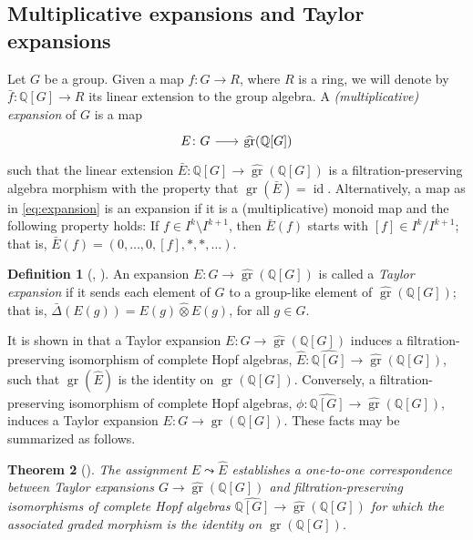\documentclass{article}
\numberwithin{equation}{section}
\newtheorem{theorem}{Theorem}[section]
\theoremstyle{definition}
\newtheorem{definition}[theorem]{Definition}
\newcommand{\Q}{\mathbb{Q}}
\DeclareMathOperator{\gr}{gr}
\DeclareMathOperator{\id}{id}
\begin{document}
\subsection{Multiplicative expansions and Taylor expansions}
\label{subsec:exp}
Let $G$ be a group. 
Given a map $f\colon G\to R$, where $R$ is a ring, we will 
denote by $\bar{f} \colon \Q[G]\to R$ its linear extension to 
the group algebra. 
A \emph{\textup{(}multiplicative\textup{)} expansion}\/
of $G$ is a map 
\begin{equation}
\label{eq:expansion}
\begin{tikzcd}[column sep=18pt]
E\colon G \ar[r]& \widehat{\gr}(\Q[G])
\end{tikzcd}
\end{equation}
such that the linear extension $\bar{E}\colon\Q[G]\to \widehat{\gr}(\Q[G])$  
is a filtration-preserving algebra morphism with the property that $\gr(\bar{E})=\id$. 
Alternatively, a map as in \eqref{eq:expansion} is an expansion 
if it is a (multiplicative) monoid map  and the following 
property holds:  If $f\in I^k\setminus I^{k+1}$, then $\bar{E}(f)$ 
starts with $[f]\in I^k/I^{k+1}$; that is, $\bar{E}(f)=(0,\dots,0,[f],*,*,\dots)$.  

\begin{definition}[\cite{Bar-Natan16}, \cite{SW-ejm}]
\label{def:taylor} 
An expansion $E\colon G \to \widehat{\gr}(\Q[G])$ is 
called a {\em Taylor expansion}\/ if it sends each element of 
$G$ to a group-like element of $\widehat{\gr}(\Q[G])$;  
that is, $\bar\Delta (E(g))=E(g) \hat{\otimes} E(g)$, 
for all $g\in G$.  
\end{definition}

It is shown in \cite{SW-ejm} that a Taylor expansion 
$E\colon G\to \widehat{\gr}(\Q[G])$ induces a 
filtration-pre\-serving isomorphism of complete Hopf algebras,  
$\widehat{E}\colon \widehat{\Q[G]}\to \widehat{\gr}(\Q[G])$, such that 
$\gr(\widehat{E})$ is the identity on $\gr(\Q[G])$. Conversely, 
a filtration-preserving isomorphism of complete Hopf algebras,  
$\phi\colon \widehat{\Q[G]}\to \widehat{\gr}(\Q[G])$, 
induces a Taylor expansion $E\colon G\to \widehat{\gr}(\Q[G])$.
These facts may be summarized as follows. 
 
\begin{theorem}[\cite{SW-ejm}]
\label{thm:TaylorHopf}
The assignment $E\leadsto \widehat{E}$ establishes a 
one-to-one correspondence between Taylor expansions 
$G\to \widehat{\gr}(\Q[G])$ and filtration-preserving isomorphisms 
of complete Hopf algebras $\widehat{\Q[G]}\to \widehat{\gr}(\Q[G])$ for which  
the associated graded morphism is the identity on $\gr(\Q[G])$. 
\end{theorem}
\end{document}
